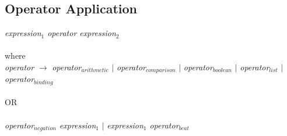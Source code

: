 \subsection{Operator Application}
\label{sec:operator application}
    \emph{expression$_{1}$  operator  expression$_{2}$}\\ \\
    where\\
    
    \emph{operator} $\rightarrow$ 
        \emph{operator$_{arithmetic}$} $|$
        \emph{operator$_{comparison}$}  $|$ 
        \emph{operator$_{boolean}$}  $|$
        \emph{operator$_{list}$}  $|$
        \emph{operator$_{binding}$} \\ \\
OR\\ \\
          \emph{operator$_{negation}$  expression$_{1}$} $|$
					\emph{expression$_{1}$ operator$_{beat}$}\\ \\
    
